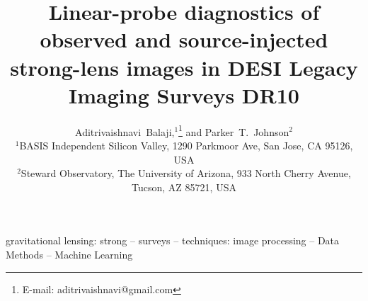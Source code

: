 \documentclass[fleqn,usenatbib]{rasti}
\title[Linear-probe diagnostics of source injection]{Linear-probe diagnostics
of observed and source-injected strong-lens images in DESI Legacy Imaging
Surveys DR10}
\author[Balaji \& Johnson]{
Aditrivaishnavi~Balaji,$^{1}$\thanks{E-mail: aditrivaishnavi@gmail.com}
and Parker~T.~Johnson$^{2}$
\\
$^{1}$BASIS Independent Silicon Valley, 1290 Parkmoor Ave, San Jose, CA
95126, USA\\
$^{2}$Steward Observatory, The University of Arizona, 933 North Cherry
Avenue, Tucson, AZ 85721, USA
}
\date{}
\begin{document}
\label{firstpage}
\pagerange{\pageref{firstpage}--\pageref{LastPage}}
\maketitle



\begin{keywords}
gravitational lensing: strong -- surveys -- techniques: image processing --
Data Methods -- Machine Learning
\end{keywords}









\end{document}
